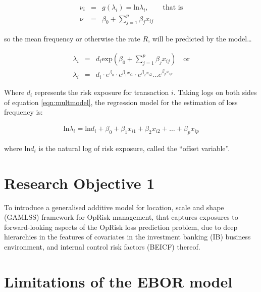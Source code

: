 \documentclass[]{DissertateUSU}
\begin{document}
\singlespacing

\begin{eqnarray}\label{eqn:linkfcn }
\nu_i &=& g(\lambda_i) = \mbox{ln}\lambda_i, \qquad \mbox{that is} \nonumber \\
\nu &=& \beta_0 + \sum_{j=1}^{p}\beta_jx_{ij}
\end{eqnarray}

\doublespacing

so the mean frequency or otherwise the rate \(R\), will be predicted by
the model\ldots

\singlespacing

\begin{eqnarray}\label{eqn:multmodel}
\lambda_i &=& d_i\mbox{exp}(\beta_0 + \sum_{j=1}^{p}\beta_jx_{ij}) \quad \mbox{or} \nonumber \\
\lambda_i &=& d_i\cdot e^{\beta_0}\cdot e^{\beta_1x_{i1}}\cdot e^{\beta_2x_{i2}} \ldots e^{\beta_px_{ip}}
\end{eqnarray}

\doublespacing

Where \(d_i\) represents the risk exposure for transaction \(i\). Taking
logs on both sides of equation \ref{eqn:multmodel}, the regression model
for the estimation of loss frequency is:

\singlespacing

\begin{eqnarray}
\mbox{ln}\lambda_i =  \mbox{ln}d_i + \beta_0 + \beta_1x_{i1} + \beta_2x_{i2} + \ldots + \beta_px_{ip}
\end{eqnarray}

\doublespacing

where \(\mbox{ln}d_i\) is the natural log of risk exposure, called the
``offset variable''.

\section{Research Objective 1}

To introduce a generalised additive model for location, scale and shape
(GAMLSS) framework for OpRisk management, that captures exposures to
forward-looking aspects of the OpRisk loss prediction problem, due to
deep hierarchies in the features of covariates in the investment banking
(IB) business environment, and internal control risk factors (BEICF)
thereof.

\section{Limitations of the EBOR model}
\end{document}
